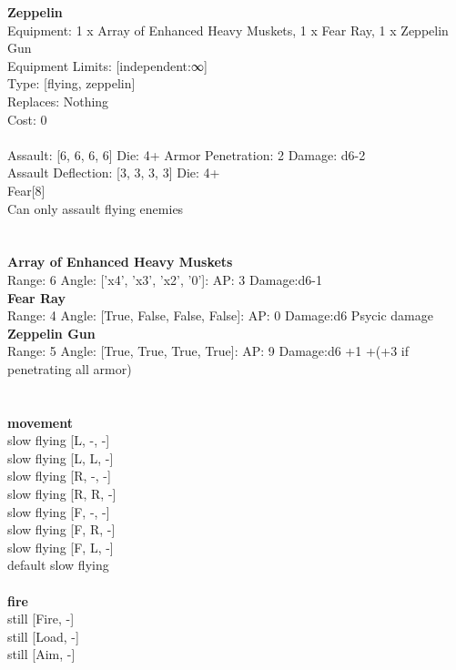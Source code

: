 {\bf Zeppelin } \\
Equipment: 1 x Array of Enhanced Heavy Muskets, 1 x Fear Ray, 1 x Zeppelin Gun \\
Equipment Limits: [independent:∞] \\
Type: [flying, zeppelin] \\
Replaces: Nothing \\
Cost: 0\\
\ \\
Assault: [6, 6, 6, 6] Die: 4+ Armor Penetration: 2 Damage: d6-2 \\
Assault Deflection: [3, 3, 3, 3] Die: 4+\\
\indent Fear[8]\\ 
Can only assault flying enemies\\ 
 
\ \\

\ \\
{\bf Array of Enhanced Heavy Muskets } \\



Range: 6  Angle: ['x4', 'x3', 'x2', '0']: AP: 3 Damage:d6-1 \\




{\bf Fear Ray } \\



Range: 4  Angle: [True, False, False, False]: AP: 0 Damage:d6 Psycic damage \\




{\bf Zeppelin Gun } \\



Range: 5  Angle: [True, True, True, True]: AP: 9 Damage:d6 +1 +(+3 if penetrating all armor) \\




 
\ \\



\ \\ {\bf movement } \\
slow flying [L, -, -] \\
slow flying [L, L, -] \\
slow flying [R, -, -] \\
slow flying [R, R, -] \\
slow flying [F, -, -] \\
slow flying [F, R, -] \\
slow flying [F, L, -] \\
default slow flying \\
\ \\ {\bf fire } \\
still [Fire, -] \\
still [Load, -] \\
still [Aim, -] \\


